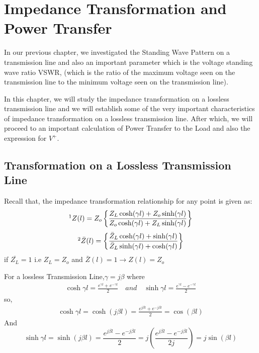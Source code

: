 \chapter{Impedance Transformation and Power Transfer}\label{lec:lec6}
In our previous chapter, we investigated the Standing Wave Pattern on a transmission line and also an important parameter which is the voltage standing wave ratio VSWR, (which is the ratio of the maximum voltage seen on the transmission line to the minimum voltage seen on the transmission line).

In this chapter, we will study the impedance transformation on a lossless
transmission line and we will establish some of the very important characteristics of impedance transformation on a lossless transmission line. After which, we will proceed to an important calculation of Power Transfer to the Load and also the expression for $V^{+}$.
\section{Transformation on a Lossless Transmission Line}
Recall that, the impedance transformation relationship for any point is given as:
\begin{align*}
\footnotemark[1]Z(l) = Z_o\left\lbrace \frac{Z_L\cosh(\gamma l) + Z_o\sinh(\gamma l)}{Z_o\cosh(\gamma l) + Z_L\sinh(\gamma l)}\right\rbrace 
\end{align*}
\begin{align*}
\footnotemark[2]\bar{Z}(l) = \left\lbrace \frac{\bar{Z}_L\cosh(\gamma l) + \sinh(\gamma l)}{\bar{Z}_L\sinh(\gamma l) + \cosh(\gamma l)}\right\rbrace 
\end{align*}
if $\bar{Z_L} = 1$ i.e $Z_L = Z_o$ and $\bar{Z}(l) = 1 \rightarrow  Z(l) = Z_o$

For a lossless Transmission Line,$\gamma=j\beta$ where
\begin{align*}
\cosh\gamma l = \frac{e^{\gamma l} + e^{-\gamma l}}{2} \quad and \quad \sinh\gamma l = \frac{e^{\gamma l} - e^{-\gamma l}}{2}
\end{align*}
so,
\begin{align*}
\cosh\gamma l= \cosh(j\beta l)=\frac{e^{j \beta l} + e^{-j \beta l}}{2}=\cos(\beta l)
\end{align*}
And
\begin{dmath*}
\sinh\gamma l=\sinh(j\beta l) = \frac{e^{j \beta l}-e^{-j\beta l}}{2} = j\left( \frac{e^{j\beta l}-e^{-j\beta l}}{2j}\right) =j\sin(\beta l)
\end{dmath*}

